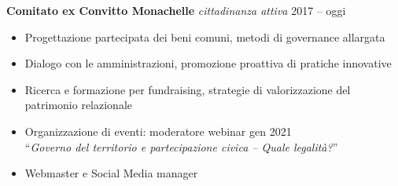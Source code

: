 \documentclass[a4paper]{article}
\begin{document}
\vspace*{2mm}
\textbf{Comitato ex Convitto Monachelle}
{\sl cittadinanza attiva} \hfill 2017 -- oggi\\
\begin{itemize} \itemsep 1pt
  \item Progettazione partecipata dei beni comuni, metodi di governance allargata
  \item Dialogo con le amministrazioni, promozione proattiva di pratiche innovative
  \item Ricerca e formazione per fundraising, strategie di valorizzazione del patrimonio relazionale
  \item Organizzazione di eventi:
        moderatore webinar gen 2021 \\
        ``\textit{Governo del territorio e partecipazione civica – Quale legalità?}''
  \item Webmaster e Social Media manager
\end{itemize}
\end{document}
